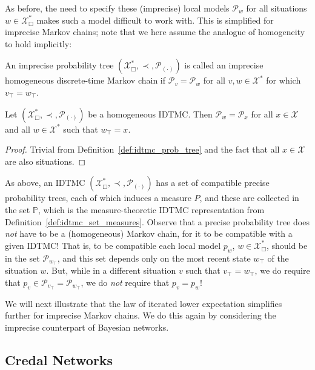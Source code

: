 \documentclass[graybox]{svmult}
\newcommand{\states}{\mathcal{X}}
\begin{document}
As before, the need to specify these (imprecise) local models $\mathcal{P}_w$ for all situations $w\in\states^*_\Box$ makes such a model difficult to work with. This is simplified for imprecise Markov chains; note that we here assume the analogue of homogeneity to hold implicitly:
\begin{definition}\label{def:idtmc_prob_tree}
An imprecise probability tree $(\states^*_\Box,\prec,\mathcal{P}_{(\cdot)})$ is called an imprecise homogeneous discrete-time Markov chain if $\mathcal{P}_v=\mathcal{P}_w$ for all $v,w\in\states^*$ for which $v_\top=w_\top$.
\end{definition}
\begin{corollary}
Let $(\states^*_\Box,\prec,\mathcal{P}_{(\cdot)})$ be a homogeneous IDTMC. Then $\mathcal{P}_w=\mathcal{P}_x$ for all $x\in\states$ and all $w\in\states^*$ such that $w_\top=x$.
\end{corollary}
\begin{proof}
Trivial from Definition~\ref{def:idtmc_prob_tree} and the fact that all $x\in\states$ are also situations.
\end{proof}
As above, an IDTMC $(\states^*_\Box,\prec,\mathcal{P}_{(\cdot)})$ has a set of compatible precise probability trees, each of which induces a measure $P$, and these are collected in the set $\mathbb{P}$, which is the measure-theoretic IDTMC representation from Definition~\ref{def:idtmc_set_measures}. Observe that a precise probability tree does \emph{not} have to be a (homogeneous) Markov chain, for it to be compatible with a given IDTMC! That is, to be compatible each local model $p_w$, $w\in\states^*_\Box$, should be in the set $\mathcal{P}_{w_\top}$, and this set depends only on the most recent state $w_\top$ of the situation $w$. But, while in a different situation $v$ such that $v_\top=w_\top$, we do require that $p_v\in\mathcal{P}_{v_\top}=\mathcal{P}_{w_\top}$, we do \emph{not} require that $p_v=p_w$!

We will next illustrate that the law of iterated lower expectation simplifies further for imprecise Markov chains. We do this again by considering the imprecise counterpart of Bayesian networks.

\subsection{Credal Networks}\label{sec:credal_net}
\end{document}
